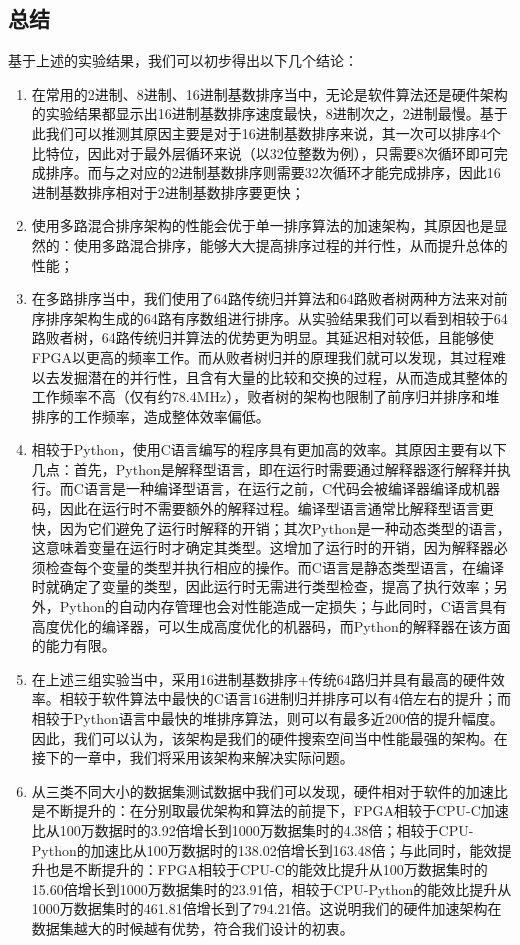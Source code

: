 \subsection{总结}
基于上述的实验结果，我们可以初步得出以下几个结论：
\begin{enumerate}
    \item 在常用的2进制、8进制、16进制基数排序当中，无论是软件算法还是硬件架构的实验结果都显示出16进制基数排序速度最快，8进制次之，2进制最慢。基于此我们可以推测其原因主要是对于16进制基数排序来说，其一次可以排序4个比特位，因此对于最外层循环来说（以32位整数为例），只需要8次循环即可完成排序。而与之对应的2进制基数排序则需要32次循环才能完成排序，因此16进制基数排序相对于2进制基数排序要更快；
    \item 使用多路混合排序架构的性能会优于单一排序算法的加速架构，其原因也是显然的：使用多路混合排序，能够大大提高排序过程的并行性，从而提升总体的性能；
    \item 在多路排序当中，我们使用了64路传统归并算法和64路败者树两种方法来对前序排序架构生成的64路有序数组进行排序。从实验结果我们可以看到相较于64路败者树，64路传统归并算法的优势更为明显。其延迟相对较低，且能够使FPGA以更高的频率工作。而从败者树归并的原理我们就可以发现，其过程难以去发掘潜在的并行性，且含有大量的比较和交换的过程，从而造成其整体的工作频率不高（仅有约78.4MHz），败者树的架构也限制了前序归并排序和堆排序的工作频率，造成整体效率偏低。
    \item 相较于Python，使用C语言编写的程序具有更加高的效率。其原因主要有以下几点：首先，Python是解释型语言，即在运行时需要通过解释器逐行解释并执行。而C语言是一种编译型语言，在运行之前，C代码会被编译器编译成机器码，因此在运行时不需要额外的解释过程。编译型语言通常比解释型语言更快，因为它们避免了运行时解释的开销；其次Python是一种动态类型的语言，这意味着变量在运行时才确定其类型。这增加了运行时的开销，因为解释器必须检查每个变量的类型并执行相应的操作。而C语言是静态类型语言，在编译时就确定了变量的类型，因此运行时无需进行类型检查，提高了执行效率；另外，Python的自动内存管理也会对性能造成一定损失；与此同时，C语言具有高度优化的编译器，可以生成高度优化的机器码，而Python的解释器在该方面的能力有限。
    \item 在上述三组实验当中，采用16进制基数排序+传统64路归并具有最高的硬件效率。相较于软件算法中最快的C语言16进制归并排序可以有4倍左右的提升；而相较于Python语言中最快的堆排序算法，则可以有最多近200倍的提升幅度。因此，我们可以认为，该架构是我们的硬件搜索空间当中性能最强的架构。在接下的一章中，我们将采用该架构来解决实际问题。
    \item 从三类不同大小的数据集测试数据中我们可以发现，硬件相对于软件的加速比是不断提升的：在分别取最优架构和算法的前提下，FPGA相较于CPU-C加速比从100万数据时的3.92倍增长到1000万数据集时的4.38倍；相较于CPU-Python的加速比从100万数据时的138.02倍增长到163.48倍；与此同时，能效提升也是不断提升的：FPGA相较于CPU-C的能效比提升从100万数据集时的15.60倍增长到1000万数据集时的23.91倍，相较于CPU-Python的能效比提升从1000万数据集时的461.81倍增长到了794.21倍。这说明我们的硬件加速架构在数据集越大的时候越有优势，符合我们设计的初衷。
\end{enumerate}


